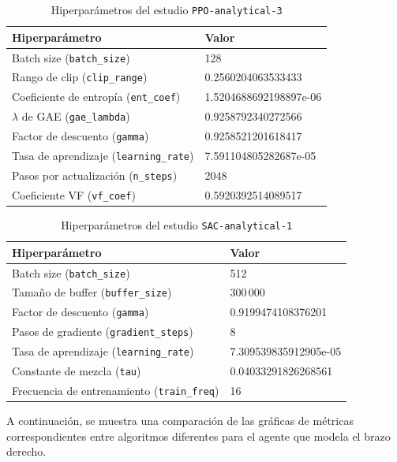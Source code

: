 \begin{table}[h!]
	\centering
	\caption{Hiperparámetros del estudio \texttt{PPO-analytical-3}}
	\begin{tabular}{|l|l|}
		\hline
		\textbf{Hiperparámetro} & \textbf{Valor} \\
		\hline
		Batch size (\texttt{batch\_size})       & 128 \\
		Rango de clip (\texttt{clip\_range})    & 0.2560204063533433 \\
		Coeficiente de entropía (\texttt{ent\_coef}) & 1.5204688692198897e-06 \\
		\(\lambda\) de GAE (\texttt{gae\_lambda})     & 0.9258792340272566 \\
		Factor de descuento (\texttt{gamma})          & 0.9258521201618417 \\
		Tasa de aprendizaje (\texttt{learning\_rate}) & 7.591104805282687e-05 \\
		Pasos por actualización (\texttt{n\_steps})   & 2048 \\
		Coeficiente VF (\texttt{vf\_coef})            & 0.5920392514089517 \\
		\hline
	\end{tabular}
	\label{tab:ppo-analytical-3}
\end{table}

\begin{table}[h!]
	\centering
	\caption{Hiperparámetros del estudio \texttt{SAC-analytical-1}}
	\begin{tabular}{|l|l|}
		\hline
		\textbf{Hiperparámetro} & \textbf{Valor} \\
		\hline
		Batch size (\texttt{batch\_size})       & 512 \\
		Tamaño de buffer (\texttt{buffer\_size}) & 300\,000 \\
		Factor de descuento (\texttt{gamma})    & 0.9199474108376201 \\
		Pasos de gradiente (\texttt{gradient\_steps}) & 8 \\
		Tasa de aprendizaje (\texttt{learning\_rate}) & 7.309539835912905e-05 \\
		Constante de mezcla (\texttt{tau})      & 0.04033291826268561 \\
		Frecuencia de entrenamiento (\texttt{train\_freq}) & 16 \\
		\hline
	\end{tabular}
	\label{tab:sac-analytical-1}
\end{table}

A continuación, se muestra una comparación de las gráficas de métricas correspondientes entre algoritmos diferentes para el agente que modela el brazo derecho.\\

